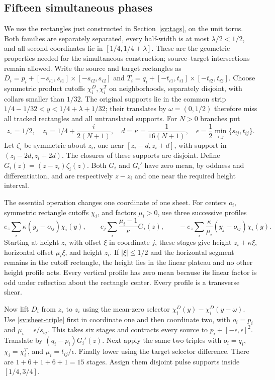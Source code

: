 \subsection{Fifteen simultaneous phases}
\label{sv:fifteen}
We use the rectangles just constructed in Section~\ref{sv:tags},
on the unit torus.  Both families are separately separated, every
half-width is at most $\lambda/2<1/2$, and all second coordinates lie
in $[1/4,1/4+\lambda]$.  These are the geometric properties needed
for the simultaneous construction; source--target intersections remain
allowed.  Write the source and target rectangles as
$D_i=p_i+[-s_{i1},s_{i1}]\times[-s_{i2},s_{i2}]$ and
$T_i=q_i+[-t_{i1},t_{i1}]\times[-t_{i2},t_{i2}]$.
Choose symmetric product cutoffs $\chi_i^D,\chi_i^T$ on
neighborhoods, separately disjoint, with collars smaller than $1/32$.
The original supports lie in the common strip
$1/4-1/32<y<1/4+\lambda+1/32$; their translates by
$\omega=(0,1/2)$ therefore miss all tracked rectangles and all
untranslated supports.  For $N>0$ branches
put
\[
 z_\circ=1/2,\quad z_i=1/4+\frac{i}{2(N+1)},\quad
 d=\kappa=\frac1{16(N+1)},\quad
 \epsilon=\frac12\min_{i,j}\{s_{ij},t_{ij}\}.
\]
Let $\zeta_i$ be symmetric about $z_i$, one near
$[z_i-d,z_i+d]$, with support in $(z_i-2d,z_i+2d)$.
The closures of these supports are disjoint.  Define
$G_i(z)=(z-z_i)\zeta_i(z)$.  Both $G_i$ and $G_i'$ have
zero mean, by oddness and differentiation, and are respectively
$z-z_i$ and one near the required height interval.

The essential operation changes one coordinate of one sheet.  For
centers $o_i$, symmetric rectangle cutoffs $\chi_i$, and factors
$\mu_i>0$, use three successive profiles
\begin{equation}\label{sv:sheet-triple}
 e_z\sum_i\kappa(y_j-o_{ij})\chi_i(y),\qquad
 e_j\sum_i\frac{\mu_i-1}{\kappa}G_i(z),\qquad
 -e_z\sum_i\frac{\kappa}{\mu_i}(y_j-o_{ij})\chi_i(y).
\end{equation}
Starting at height $z_i$ with offset $\xi$ in coordinate $j$,
these stages give height $z_i+\kappa\xi$, horizontal offset
$\mu_i\xi$, and height $z_i$.  If $|\xi|\le1/2$ and the
horizontal segment remains in the cutoff rectangle, the height lies
in the linear plateau and no other height profile acts.  Every vertical
profile has zero mean because its linear factor is odd under reflection
about the rectangle center.  Every profile is a transverse shear.

Now lift $D_i$ from $z_\circ$ to $z_i$ using the mean-zero selector
$\chi_i^D(y)-\chi_i^D(y-\omega)$.  Use
\eqref{sv:sheet-triple} first in coordinate one and then coordinate
two, with $o_i=p_i$ and $\mu_i=\epsilon/s_{ij}$.
This takes six stages and contracts every source to
$p_i+[-\epsilon,\epsilon]^2$.  Translate by
$(q_i-p_i)G_i'(z)$.  Next apply the same two triples with
$o_i=q_i$, $\chi_i=\chi_i^T$, and
$\mu_i=t_{ij}/\epsilon$.  Finally lower using the target
selector difference.  There are $1+6+1+6+1=15$ stages.
Assign them disjoint pulse supports inside $[1/4,3/4]$.

